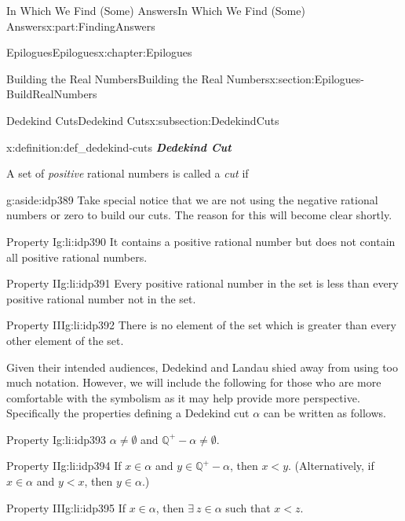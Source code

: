 \documentclass[oneside,10pt,]{book}
\newcommand{\alert}[1]{\textbf{\textit{#1}}}
\numberwithin{equation}{section}
\newcommand{\QQ}{\mathbb {Q}}
\newcommand{\lt}{<}
\begin{document}
\begin{partptx}{In Which We Find (Some) Answers}{}{In Which We Find (Some) Answers}{}{}{x:part:FindingAnswers}
\begin{chapterptx}{Epilogues}{}{Epilogues}{}{}{x:chapter:Epilogues}
\begin{sectionptx}{Building the Real Numbers}{}{Building the Real Numbers}{}{}{x:section:Epilogues-BuildRealNumbers}
\begin{subsectionptx}{Dedekind Cuts}{}{Dedekind Cuts}{}{}{x:subsection:DedekindCuts}
\begin{definition}{}{x:definition:def_dedekind-cuts}
\alert{Dedekind Cut}%
\par
{} A set of \emph{positive} rational numbers is called a \emph{cut} if%
\begin{aside}{}{g:aside:idp389}%
Take special notice that we are not using the negative rational numbers or zero to build our cuts.  The reason for this will become clear shortly.%
\end{aside}
%
\begin{descriptionlist}
\begin{dlimedium}{Property I}{g:li:idp390}%
It contains a positive rational number but does not contain all positive rational numbers.%
\end{dlimedium}%
\begin{dlimedium}{Property II}{g:li:idp391}%
Every positive rational number in the set is less than every positive rational number not in the set.%
\end{dlimedium}%
\begin{dlimedium}{Property III}{g:li:idp392}%
There is no element of the set which is greater than every other element of the set.%
\end{dlimedium}%
\end{descriptionlist}
%
\end{definition}
Given their intended audiences, Dedekind  and Landau shied away from using too much notation. However, we will include the following for those who are more comfortable with the symbolism as it may help provide more perspective. Specifically the properties defining a Dedekind cut \(\alpha\) can be written as follows.%
\par
%
\begin{descriptionlist}
\begin{dlimedium}{Property I}{g:li:idp393}%
\(\alpha\ne\emptyset\) and \(\QQ^+-\alpha\ne\emptyset\).%
\end{dlimedium}%
\begin{dlimedium}{Property II}{g:li:idp394}%
If \(x\in\alpha\) and \(y\in\QQ^+-\alpha\), then \(x\lt y\). (Alternatively, if \(x\in\alpha\) and \(y\lt x\), then \(y\in\alpha\).)%
\end{dlimedium}%
\begin{dlimedium}{Property III}{g:li:idp395}%
If \(x\in\alpha\), then \(\exists\ z\in\alpha\) such that \(x\lt z\).%
\end{dlimedium}%
\end{descriptionlist}

\end{subsectionptx}
\end{sectionptx}
\end{chapterptx}
\end{partptx}
\end{document}
